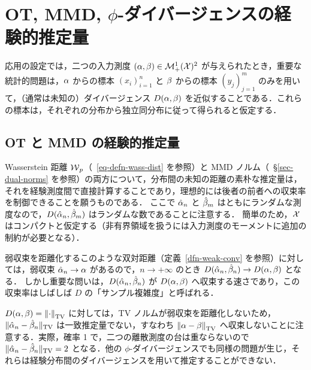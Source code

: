 \section{OT, MMD, $\phi$-ダイバージェンスの経験的推定量}
\label{sec-empirical-wass}

応用の設定では，二つの入力測度 $(\alpha,\beta) \in \mathcal{M}_+^1(\mathcal{X})^2$ が与えられたとき，重要な統計的問題は，$\alpha$ からの標本 $(x_i)_{i=1}^n$ と $\beta$ からの標本 $(y_j)_{j=1}^m$ のみを用いて，（通常は未知の）ダイバージェンス $D(\alpha,\beta)$ を近似することである．これらの標本は，それぞれの分布から独立同分布に従って得られると仮定する．

\subsection{OT と MMD の経験的推定量}

Wasserstein 距離 $\operatorname{\mathcal{W}}_p$（~\ref{eq-defn-wass-dist} を参照）と MMD ノルム（~\S\ref{sec-dual-norms} を参照）の両方について，分布間の未知の距離の素朴な推定量は，それを経験測度間で直接計算することであり，理想的には後者の前者への収束率を制御できることを願うものである．
ここで $\hat {\alpha}_n$ と $\hat {\beta}_m$ はともにランダムな測度なので，$D(\hat {\alpha}_n,\hat {\beta}_m)$ はランダムな数であることに注意する．
%
簡単のため，$\mathcal{X}$ はコンパクトと仮定する（非有界領域を扱うには入力測度のモーメントに追加の制約が必要となる）．

弱収束を距離化するこのような双対距離（定義~\ref{dfn-weak-conv} を参照）に対しては，弱収束 $\hat{\alpha}_n \rightarrow \alpha$ があるので，$n \rightarrow +\infty$ のとき $D(\hat {\alpha}_n,\hat {\beta}_n) \rightarrow D(\alpha,\beta)$ となる．
%
しかし重要な問いは，$D(\hat {\alpha}_n,\hat {\beta}_n)$ が $D(\alpha,\beta)$ へ収束する速さであり，この収束率はしばしば $D$ の「サンプル複雑度」と呼ばれる．

$D(\alpha,\beta) = \left\| \cdot \right\|_{\operatorname{TV}}$ に対しては，TV ノルムが弱収束を距離化しないため，$\| \hat {\alpha}_n - \hat {\beta}_n \|_{\operatorname{TV}}$ は一致推定量でない，すなわち $\left\| \alpha-\beta \right\|_{\operatorname{TV}}$ へ収束しないことに注意する．実際，確率 1 で，二つの離散測度の台は重ならないので $\| \hat {\alpha}_n - \hat {\beta}_n \|_{\operatorname{TV}}=2$ となる．他の $\phi$-ダイバージェンスでも同様の問題が生じ，それらは経験分布間のダイバージェンスを用いて推定することができない．


